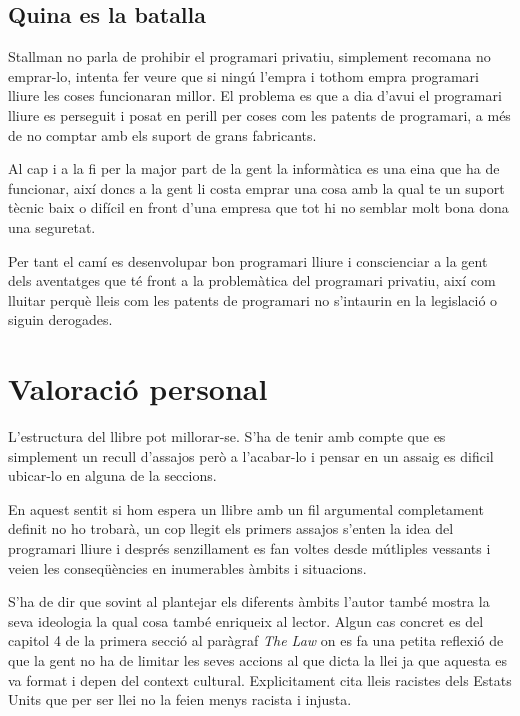 \documentclass[a4paper,11pt]{scrartcl}
\begin{document}
\subsection{Quina es la batalla}

Stallman no parla de prohibir el programari privatiu, simplement recomana
no emprar-lo, intenta fer veure que si ningú l'empra i tothom empra
programari lliure les coses funcionaran millor. El problema es que
a dia d'avui el programari lliure es perseguit i posat en perill per coses
com les patents de programari, a més de no comptar amb els suport
de grans fabricants.

Al cap i a la fi per la major part de la gent la informàtica es una
eina que ha de funcionar, així doncs a la gent li costa emprar una cosa
amb la qual te un suport tècnic baix o difícil en front d'una empresa
que tot hi no semblar molt bona dona una seguretat.

Per tant el camí es desenvolupar bon programari lliure i conscienciar a
la gent dels aventatges que té front a la problemàtica del programari
privatiu, així com lluitar perquè lleis com les patents de programari
no s'intaurin en la legislació o siguin derogades.









  \section{Valoració personal}

L'estructura del llibre pot millorar-se. S'ha de tenir amb compte que es simplement
un recull d'assajos però a l'acabar-lo i pensar en un assaig es dificil ubicar-lo en alguna de la seccions.

En aquest sentit si hom espera un llibre amb un fil argumental completament definit no ho trobarà,
un cop llegit els primers assajos s'enten la idea del programari lliure i després senzillament
es fan voltes desde mútliples vessants i veien les conseqüències en inumerables àmbits i situacions.

S'ha de dir que sovint al plantejar els diferents àmbits l'autor també mostra la seva ideologia
 la qual cosa també enriqueix al lector. Algun cas concret
es del capitol 4 de la primera secció al paràgraf \emph{The Law} on es fa una petita reflexió
de que la gent no ha de limitar les seves accions al que dicta la llei ja que aquesta es va format
i depen del context cultural. Explicitament cita lleis racistes dels Estats Units que per ser llei
no la feien menys racista i injusta.
\end{document}
